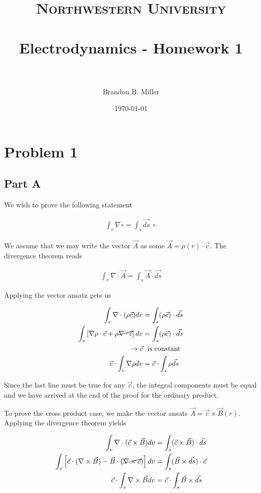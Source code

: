 \documentclass[paper=a4, fontsize=11pt]{scrartcl} %
\title{	
\normalfont \normalsize 
\textsc{Northwestern University} \\ [25pt] %
\horrule{0.5pt} \\[0.4cm] %
\huge Electrodynamics - Homework 1 \\ %
\horrule{2pt} \\[0.5cm] %
}
\author{Brandon B. Miller} %
\date{\normalsize\today} %
\numberwithin{equation}{section} %
\numberwithin{figure}{section} %
\numberwithin{table}{section} %
\begin{document}
\maketitle %

\section{Problem 1}


\subsection{Part A}

We wish to prove the following statement 

\begin{align}
\int_v \nabla \circ = \int_s \vec{ds}  \ \circ
\end{align}

We assume that we may write the vector $\vec{A}$ as some $\vec{A} = \rho(r) \cdot \vec{c}$. The divergence theorem reads

\begin{align}
\int_v \nabla \cdot \vec{A} = \int_s \vec{A}\cdot\vec{ds}
\end{align}

Applying the vector ansatz gets us 

\begin{align}
\int_v \nabla \cdot (\rho \vec{c})dv &= \int_s (\rho \vec{c}) \cdot \vec{ds} \\
\int_v \left[\nabla \rho \cdot \vec{c} + \rho \cancel{\nabla \cdot \vec{c}}\right]dv &=  \int_s (\rho \vec{c}) \cdot \vec{ds}\\
\rightarrow \vec{c} & \ \  \text{is constant} \\
\vec{c} \cdot \int_v \nabla \rho dv &= \vec{c} \cdot \int_s \rho \vec{ds}
\end{align}

Since the last line must be true for any $\vec{c}$, the integral components must be equal and we have arrived at the end of the proof for the ordinary product. 

To prove the cross product case, we make the vector ansats $\vec{A} = \vec{c} \times \vec{B}(r)$. Applying the divergence theorem yields

\begin{align}
\int_v \nabla \cdot (\vec{c} \times \vec{B}) dv &= \int_s (\vec{c} \times \vec{B}) \cdot \vec{ds} \\
\int_v \left[\vec{c} \cdot (\nabla \times \vec{B}) - \vec{B} \cdot (\cancel{\nabla \times \vec{c}})\right]dv &= \int_s (\vec{B} \times \vec{ds}) \cdot \vec{c} \\
\vec{c} \cdot \int_v \nabla \times \vec{B} dv &= \vec{c} \cdot \int_s \vec{B} \times \vec{ds} 
\end{align}
\end{document}
